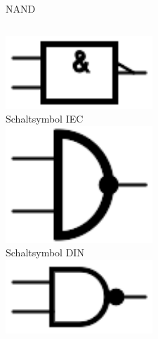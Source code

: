 \begin{frame}{NAND}
  \begin{columns}
    \includegraphics[width=\textwidth,height=.2\textheight,keepaspectratio]{a14/NAND_IEC.pdf}\\
    {\small Schaltsymbol IEC}\\
    \includegraphics[width=\textwidth,height=.2\textheight,keepaspectratio]{a14/NAND_DIN.pdf}\\
    {\small Schaltsymbol DIN}\\
    \includegraphics[width=\textwidth,height=.2\textheight,keepaspectratio]{a14/NAND_ANSI.pdf}\\

\end{columns}
\end{frame}
